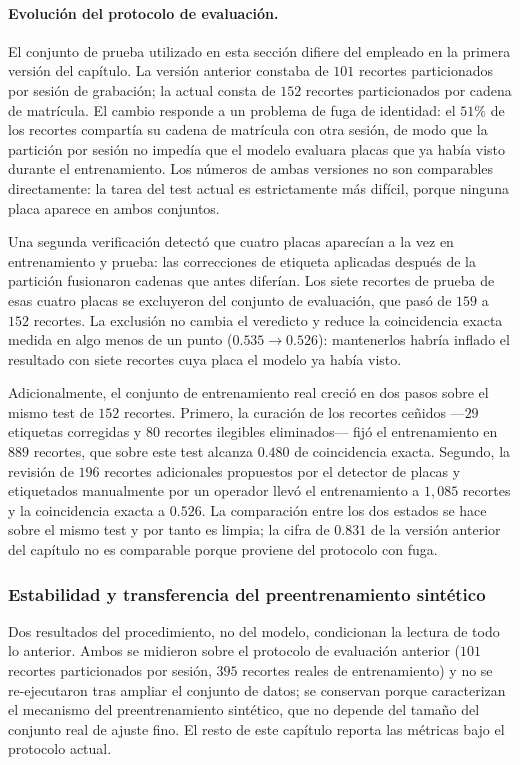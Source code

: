 \paragraph{Evolución del protocolo de evaluación.}
El conjunto de prueba utilizado en esta sección difiere del empleado en la primera
versión del capítulo. La versión anterior constaba de $101$ recortes particionados
por sesión de grabación; la actual consta de $152$ recortes particionados por cadena
de matrícula. El cambio responde a un problema de fuga de identidad: el $51\%$ de
los recortes compartía su cadena de matrícula con otra sesión, de modo que la
partición por sesión no impedía que el modelo evaluara placas que ya había visto
durante el entrenamiento. Los números de ambas versiones no son comparables
directamente: la tarea del test actual es estrictamente más difícil, porque ninguna
placa aparece en ambos conjuntos.

Una segunda verificación detectó que cuatro placas aparecían a la vez en
entrenamiento y prueba: las correcciones de etiqueta aplicadas después de la
partición fusionaron cadenas que antes diferían. Los siete recortes de prueba de
esas cuatro placas se excluyeron del conjunto de evaluación, que pasó de $159$ a
$152$ recortes. La exclusión no cambia el veredicto y reduce la coincidencia exacta
medida en algo menos de un punto ($0{.}535 \rightarrow 0{.}526$): mantenerlos habría
inflado el resultado con siete recortes cuya placa el modelo ya había visto.

Adicionalmente, el conjunto de entrenamiento real creció en dos pasos sobre el
mismo test de $152$ recortes. Primero, la curación de los recortes ceñidos
---$29$ etiquetas corregidas y $80$ recortes ilegibles eliminados--- fijó el
entrenamiento en $889$ recortes, que sobre este test alcanza $0{.}480$ de
coincidencia exacta. Segundo, la revisión de $196$ recortes adicionales
propuestos por el detector de placas y etiquetados manualmente por un operador
llevó el entrenamiento a $1{,}085$ recortes y la coincidencia exacta a $0{.}526$.
La comparación entre los dos estados se hace sobre el mismo test y por tanto es
limpia; la cifra de $0{.}831$ de la versión anterior del capítulo no es
comparable porque proviene del protocolo con fuga.

\subsubsection{Estabilidad y transferencia del preentrenamiento sintético}

Dos resultados del procedimiento, no del modelo, condicionan la lectura de todo lo
anterior. Ambos se midieron sobre el protocolo de evaluación anterior
($101$ recortes particionados por sesión, $395$ recortes reales de entrenamiento)
y no se re-ejecutaron tras ampliar el conjunto de datos; se conservan porque
caracterizan el mecanismo del preentrenamiento sintético, que no depende del
tamaño del conjunto real de ajuste fino. El resto de este capítulo reporta las
métricas bajo el protocolo actual.

